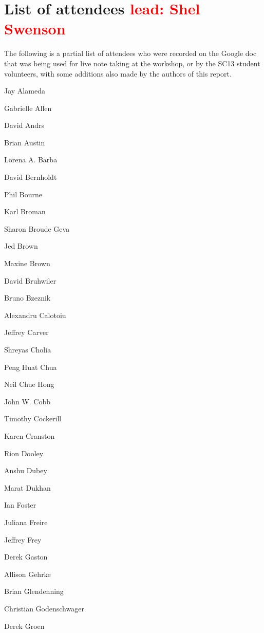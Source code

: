 \documentclass[11pt, oneside]{amsart}
\newcommand{\note}[1]{ {\textcolor{red}    { #1 }}}
\begin{document}
\appendix
\section{List of attendees \note{lead: Shel Swenson}}


The following is a partial list of attendees who were recorded on the
Google doc~\cite{WSSSPE1-google-notes} that was being used for live note taking at the workshop, or by the SC13 student volunteers, with some additions also made by the authors of this report.


\begin{multicols}{3}
\setlength{\parindent}{0pt}

Jay Alameda

Gabrielle Allen

David Andrs

Brian Austin

Lorena A. Barba

David Bernholdt

Phil Bourne

Karl Broman

Sharon Broude Geva

Jed Brown

Maxine Brown

David Bruhwiler

Bruno Bzeznik

Alexandru Calotoiu

Jeffrey Carver

Shreyas Cholia

Peng Huat Chua

Neil Chue Hong %

John W. Cobb

Timothy Cockerill

Karen Cranston

Rion Dooley

Anshu Dubey

Marat Dukhan

Ian Foster

Juliana Freire

Jeffrey Frey

Derek Gaston

Allison Gehrke

Brian Glendenning

Christian Godenschwager

Derek Groen


\end{multicols}
\end{document}

